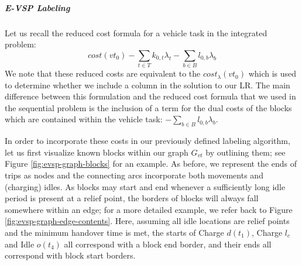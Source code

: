 \documentclass[]{article}
\begin{document}
\subparagraph{E-VSP Labeling} Let us recall the reduced cost formula for a vehicle task in the integrated problem: 
\begin{equation}
cost(vt_0) - \sum_{t \in T}k_{0,t} \lambda_t - \sum_{b \in B}l_{0,b}\lambda_b \nonumber
\end{equation}
We note that these reduced costs are equivalent to the $cost_\lambda(vt_0)$ which is used to determine whether we include a column in the solution to our LR. The main difference between this formulation and the reduced cost formula that we used in the sequential problem is the inclusion of a term for the dual costs of the blocks which are contained within the vehicle task: $-\sum_{b \in B}l_{0,b}\lambda_b$.

In order to incorporate these costs in our previously defined labeling algorithm, let us first visualize known blocks within our graph $G_{vt}$ by outlining them; see Figure \ref{fig:evsp-graph-blocks} for an example. As before, we represent the ends of trips as nodes and the connecting arcs incorporate both movements and (charging) idles. As blocks may start and end whenever a sufficiently long idle period is present at a relief point, the borders of blocks will always fall somewhere within an edge; for a more detailed example, we refer back to Figure \ref{fig:evsp-graph-edge-contents}. Here, assuming all idle locations are relief points and the minimum handover time is met, the starts of Charge $d(t_1)$, Charge $l_c$ and Idle $o(t_4)$ all correspond with a block end border, and their ends all correspond with block start borders.
\end{document}
